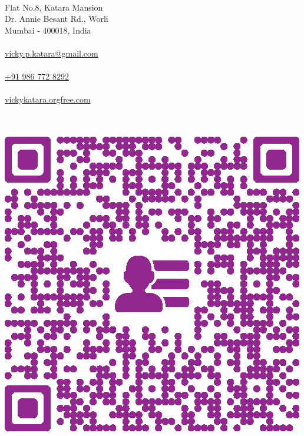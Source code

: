 \documentclass[a4paper,12pt,final]{memoir}
\newcommand{\Sep}{\vspace{1.5em}}
\newcommand{\SmallSep}{\vspace{0.5em}}
\begin{document}

\begin{flushright} 
	\footnotesize
	\SmallSep
	{\bfseries{\color{Plum}{Address}}}\\
	
	Flat No.8, Katara Mansion\\
	Dr. Annie Besant Rd., Worli\\
	Mumbai - 400018, India\\
	\Sep
	{\bfseries{\color{Plum}{EMail}}}\\
	\href{mailto:vicky.p.katara@gmail.com}{vicky.p.katara@gmail.com}\\
	\Sep
	{\bfseries{\color{Plum}{Cellphone}}}\\
	\href{tel:+919867728292}{+91 986 772 8292}\\
	\Sep
		{\bfseries{\color{Plum}{Website}}}\\
	\href{http://vickykatara.orgfree.com/}{vickykatara.orgfree.com}\\
\end{flushright}\normalsize
	\hspace{0.5cm}
	\vspace{-0.35cm}
	\bfseries{\color{Plum}{Contact Information}}\\\\
	\vspace{-0.1cm}
	\hspace{-0.4cm}
	\includegraphics[width=0.8\columnwidth]{qrcode_2.eps}
\framebreak
\end{document}
